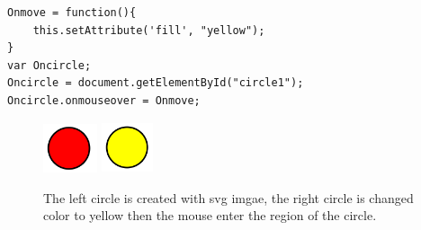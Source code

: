 \documentclass[11pt]{report}
\begin{document}
\begin{lstlisting}
Onmove = function(){
    this.setAttribute('fill', "yellow");
}
var Oncircle;
Oncircle = document.getElementById("circle1");
Oncircle.onmouseover = Onmove;
\end{lstlisting}

\begin{figure}[h]
	\begin{center}
		\includegraphics[height = 1.45cm, width = 1.6cm]{figure/svg/svgdemo0.PNG}
		\hspace{4cm}
		\includegraphics[height = 1.5cm, width = 1.5cm]{figure/svg/svgdemo1.PNG}
		\caption{The left circle is created with svg imgae, the right circle is changed color to yellow then the mouse enter the region of the circle. }
		\label{Example_6.3.0}
	\end{center}
\end{figure}

\newpage
\end{document}
